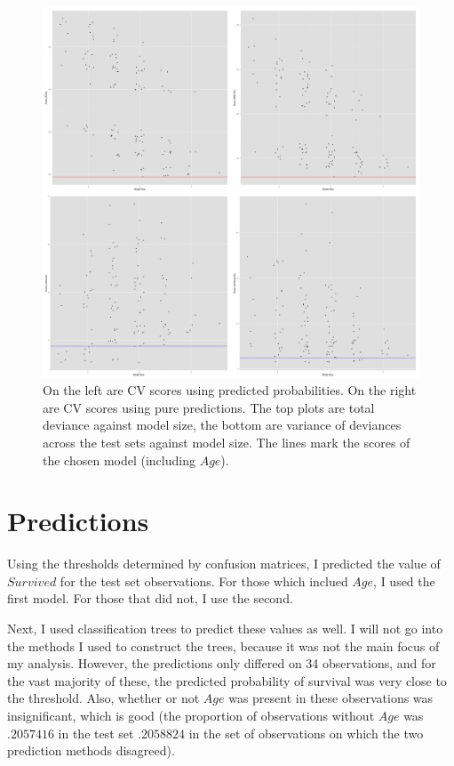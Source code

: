 \documentclass[12pt]{article}
\begin{document}
\begin{figure}[ht!]
\centering
\includegraphics[width=180mm]{cv.png}
\caption{On the left are CV scores using predicted probabilities.  On the right are CV scores using pure predictions.  The top plots are total deviance against model size, the bottom are variance of deviances across the test sets against model size.  The lines mark the scores of the chosen model (including $Age$).}
\end{figure}

\section{Predictions}

Using the thresholds determined by confusion matrices, I predicted the value of $Survived$ for the test set observations.  For those which inclued $Age$, I used the first model.  For those that did not, I use the second.

Next, I used classification trees to predict these values as well.  I will not go into the methods I used to construct the trees, because it was not the main focus of my analysis.  However, the predictions only differed on 34 observations, and for the vast majority of these, the predicted probability of survival was very close to the threshold.  Also, whether or not $Age$ was present in these observations was insignificant, which is good (the proportion of observations without $Age$ was $.2057416$ in the test set $.2058824$ in the set of observations on which the two prediction methods disagreed).
\end{document}
